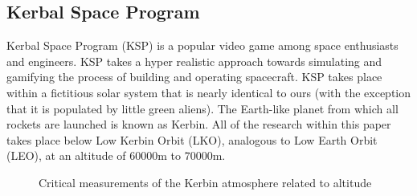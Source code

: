 \documentclass[journal,a4paper,12pt]{IEEEtran}
\begin{document}
\subsection{Kerbal Space Program}
Kerbal Space Program (KSP) is a popular video game among space enthusiasts and
engineers. KSP takes a hyper realistic approach towards simulating and gamifying
the process of building and operating spacecraft. KSP takes place within a fictitious
solar system that is nearly identical to ours (with the exception that it is populated
by little green aliens). The Earth-like planet from which all rockets are launched
is known as Kerbin. All of the research within this paper takes place below Low Kerbin
Orbit (LKO), analogous to Low Earth Orbit (LEO), at an altitude of $60000$m to
$70000$m.

\begin{figure}[h!]
  \centering
  \caption{Critical measurements of the Kerbin atmosphere related to altitude}
  \label{Kerbin_atmo}
\end{figure}
\end{document}
